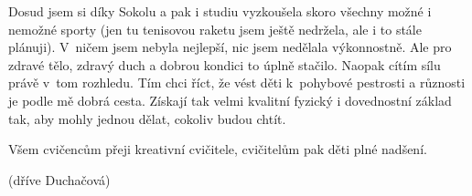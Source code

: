 \documentclass[11pt]{article}
\begin{document}
Dosud jsem si díky Sokolu a pak i studiu vyzkoušela skoro všechny možné i nemožné sporty (jen tu tenisovou raketu jsem ještě nedržela, ale i to stále plánuji). V~ničem jsem nebyla nejlepší, nic jsem nedělala výkonnostně. Ale pro zdravé tělo, zdravý duch a dobrou kondici to úplně stačilo. Naopak cítím sílu právě v~tom rozhledu. Tím chci říct, že vést děti k~pohybové pestrosti a různosti je podle mě dobrá cesta.\linebreak
\clearpage\noindent
Získají tak velmi kvalitní fyzický i dovednostní základ tak, aby mohly jednou dělat, cokoliv budou chtít.

Všem cvičencům přeji kreativní cvičitele, cvičitelům pak děti plné nadšení.

\signature{Ája Krásová}{(dříve Duchačová)}

\clearpage


\pagecolor{sokolred}
\color{white}
\renewcommand{\arraystretch}{1.5}

\newcommand{\boxheight}{12cm}

\vspace*{\fill}
\vspace*{0pt}
\end{document}
